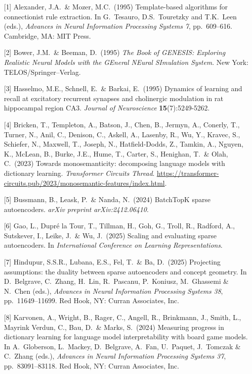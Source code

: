\documentclass{article}
\begin{document}
{
\small


[1] Alexander, J.A.\ \& Mozer, M.C.\ (1995) Template-based algorithms for
connectionist rule extraction. In G.\ Tesauro, D.S.\ Touretzky and T.K.\ Leen
(eds.), {\it Advances in Neural Information Processing Systems 7},
pp.\ 609--616. Cambridge, MA: MIT Press.


[2] Bower, J.M.\ \& Beeman, D.\ (1995) {\it The Book of GENESIS: Exploring
  Realistic Neural Models with the GEneral NEural SImulation System.}  New York:
TELOS/Springer--Verlag.


[3] Hasselmo, M.E., Schnell, E.\ \& Barkai, E.\ (1995) Dynamics of learning and
recall at excitatory recurrent synapses and cholinergic modulation in rat
hippocampal region CA3. {\it Journal of Neuroscience} {\bf 15}(7):5249-5262.


[4] Bricken, T., Templeton, A., Batson, J., Chen, B., Jermyn, A., Conerly, T., Turner, N., Anil, C.,
Denison, C., Askell, A., Lasenby, R., Wu, Y., Kravec, S., Schiefer, N., Maxwell, T., Joseph, N.,
Hatfield-Dodds, Z., Tamkin, A., Nguyen, K., McLean, B., Burke, J.E., Hume, T., Carter, S.,
Henighan, T.\ \& Olah, C.\ (2023) Towards monosemanticity: decomposing language models with
dictionary learning. {\it Transformer Circuits Thread}.
\url{https://transformer-circuits.pub/2023/monosemantic-features/index.html}.


[5] Bussmann, B., Leask, P.\ \& Nanda, N.\ (2024) BatchTopK sparse autoencoders. {\it arXiv
preprint arXiv:2412.06410}.


[6] Gao, L., Dupr\'e la Tour, T., Tillman, H., Goh, G., Troll, R., Radford, A., Sutskever, I.,
Leike, J.\ \& Wu, J.\ (2025) Scaling and evaluating sparse autoencoders. In {\it
International Conference on Learning Representations}.


[7] Hindupur, S.S.R., Lubana, E.S., Fel, T.\ \& Ba, D.\ (2025) Projecting assumptions: the duality
between sparse autoencoders and concept geometry. In D.\ Belgrave, C.\ Zhang, H.\ Lin,
R.\ Pascanu, P.\ Koniusz, M.\ Ghassemi \& N.\ Chen (eds.), {\it Advances in Neural Information
Processing Systems 38}, pp.\ 11649--11699. Red Hook, NY: Curran Associates, Inc.


[8] Karvonen, A., Wright, B., Rager, C., Angell, R., Brinkmann, J., Smith, L., Mayrink Verdun, C.,
Bau, D.\ \& Marks, S.\ (2024) Measuring progress in dictionary learning for language model
interpretability with board game models. In A.\ Globerson, L.\ Mackey, D.\ Belgrave, A.\ Fan,
U.\ Paquet, J.\ Tomczak \& C.\ Zhang (eds.), {\it Advances in Neural Information Processing
Systems 37}, pp.\ 83091--83118. Red Hook, NY: Curran Associates, Inc.


}
\end{document}
